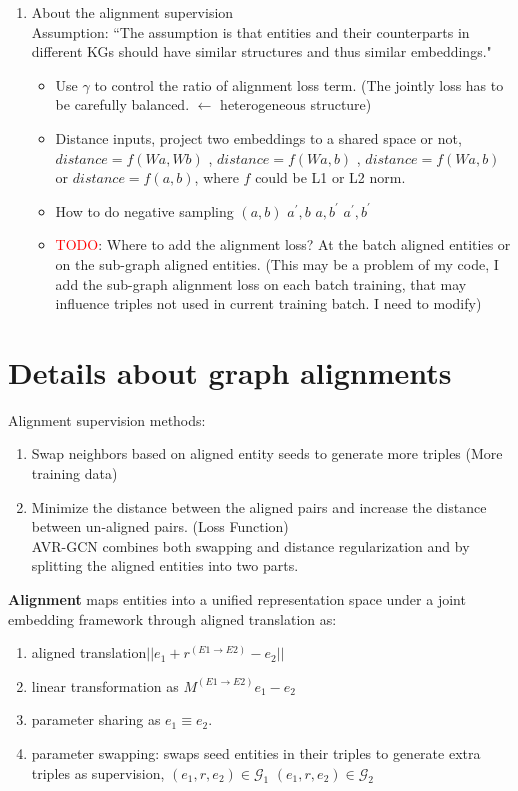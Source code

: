 \begin{enumerate}
    
    \item About the alignment supervision \\
        Assumption: ``The assumption is that entities and their counterparts in different KGs should have similar structures and thus similar embeddings."
        \begin{itemize}
            \item Use $\gamma$ to control the ratio of alignment loss term. (The jointly loss has to be carefully balanced. $\leftarrow$ heterogeneous structure) 
            \item Distance inputs, project two embeddings to a shared space or not, $distance= f(Wa,Wb)$ , $distance=f(Wa,b)$ , $distance=f(Wa,b)$ or $distance=f(a,b)$, where $f$ could be L1 or L2 norm. 
            \item How to do negative sampling $(a,b)$ $a^{\prime}, b$ $a, b^{\prime}$ $a^{\prime}, b^{\prime}$
            \item \textcolor{red}{TODO}: Where to add the alignment loss? At the batch aligned entities or on the sub-graph aligned entities. (This may be a problem of my code, I add the sub-graph alignment loss on each batch training, that may influence triples not used in current training batch. I need to modify)
        \end{itemize}
\end{enumerate}


\section{Details about graph alignments }
Alignment supervision methods:
\begin{enumerate}
    \item Swap neighbors based on aligned entity seeds to generate more triples (More training data)  
    \item Minimize the distance between the aligned pairs and increase the distance between un-aligned pairs.  (Loss Function) \\
    AVR-GCN\citep{Ye2019AVR} combines both swapping and distance regularization and by splitting the aligned entities into two parts. 
\end{enumerate}

\noindent \textbf{Alignment}
maps entities into a unified representation space under
a joint embedding framework through aligned
translation as: 
    \begin{enumerate}
        \item aligned translation$\big |\big| e_1 + r^{(E1 \rightarrow E2)}  -  e_2 \big |\big|$   
        \item linear transformation as $M^{(E1\rightarrow E2)}e_1 - e_2$    
        \item parameter sharing as $e_1 \equiv e_2$.   
        \item parameter swapping: swaps seed entities in their triples to generate extra triples as supervision, $(e_1,r,e_2) \in \mathcal{G}_1$ $(e_1,r,e_2) \in \mathcal{G}_2$ 
    \end{enumerate}
    
